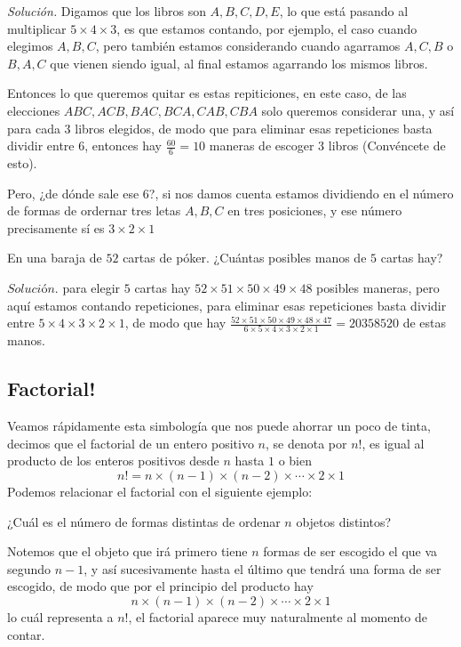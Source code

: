 \documentclass[11pt]{scrartcl}
\begin{document}
\begin{flushleft}
    \textit{Solución.} Digamos que los libros son $A,B,C,D,E$, lo que está pasando al multiplicar $5\times 4\times 3$, es que estamos contando, por ejemplo, el caso cuando elegimos $A,B,C$, pero también estamos considerando cuando agarramos $A,C,B$ o $B,A,C$ que vienen siendo igual, al final estamos agarrando los mismos libros.
\end{flushleft}
    
\begin{flushleft}
    
    Entonces lo que queremos quitar es estas repiticiones, en este caso, de las elecciones $ABC, ACB, BAC, BCA, CAB, CBA$ solo queremos considerar una, y así para cada $3$ libros elegidos, de modo que para eliminar esas repeticiones basta dividir entre $6$, entonces hay $\frac{60}{6}=10$ maneras de escoger $3$ libros (Convéncete de esto).
\end{flushleft}

\begin{flushleft}
Pero, ¿de dónde sale ese 6?, si nos damos cuenta estamos dividiendo en el número de formas de ordernar tres letas $A,B,C$ en tres posiciones, y ese número precisamente sí es $3\times 2\times 1$
\end{flushleft}
\begin{example}
    En una baraja de $52$ cartas de póker. ¿Cuántas posibles manos de $5$ cartas hay?
\end{example}
\begin{flushleft}
    $\textit{Solución.}$ para elegir $5$ cartas hay $52\times 51\times 50\times 49\times 48$ posibles maneras, pero aquí estamos contando repeticiones, para eliminar esas repeticiones basta dividir entre $5\times 4\times 3\times 2\times 1$, de modo que hay $\frac{52\times51\times 50\times 49\times 48\times 47}{6\times 5\times 4\times 3\times 2\times 1}=20358520$ de estas manos.
\end{flushleft}

\subsection*{Factorial!}
\begin{flushleft}
    
Veamos rápidamente esta simbología que nos puede ahorrar un poco de tinta, decimos que el factorial de un entero positivo $n$, se denota por $n!$, es igual al producto de los enteros positivos desde $n$ hasta $1$ o bien 
\[n!=n\times (n-1)\times (n-2)\times\cdots\times 2\times  1\]
Podemos relacionar el factorial con el siguiente ejemplo:
\begin{example}
    ¿Cuál es el número de formas distintas de ordenar $n$ objetos distintos?
\end{example}
Notemos que el objeto que irá primero tiene $n$ formas de ser escogido el que va segundo $n-1$, y así sucesivamente hasta el último que tendrá una forma de ser escogido, de modo que por el principio del producto hay \[n\times (n-1)\times (n-2)\times\cdots\times 2\times  1\] lo cuál representa a $n!$, el factorial aparece muy naturalmente al momento de contar.
\end{flushleft}
\end{document}
